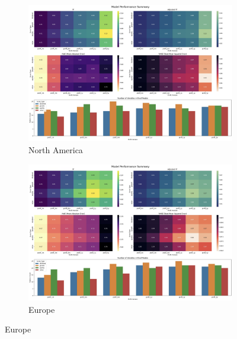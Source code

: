 \documentclass[11pt,english,a4paper,hidelinks]{book}
\begin{document}
\begin{figure}[H]
    \centering
    \begin{subfigure}[b]{0.48\textwidth}
        \centering
        \includegraphics[width=\textwidth]{images/code/models/linear_regression/second_model/USA - performance.png}
        \caption{North America}
    \end{subfigure}
    \hfill
    \begin{subfigure}[b]{0.48\textwidth}
        \centering
        \includegraphics[width=\textwidth]{images/code/models/linear_regression/second_model/EU - performance.png}
        \caption{Europe}
    \end{subfigure}
    \hfill
    
    \vspace{0.5cm}
    

\end{figure}
\end{document}
